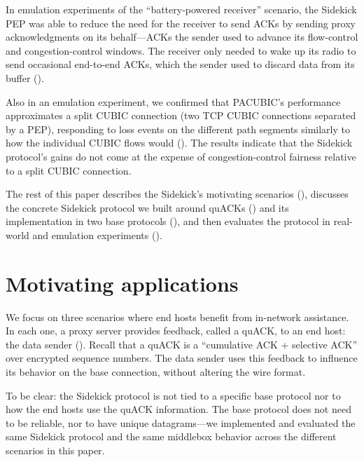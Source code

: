 In emulation experiments of the ``battery-powered receiver'' scenario,
the Sidekick PEP was able to reduce the need for the receiver to send ACKs
by sending proxy acknowledgments on its behalf---ACKs the sender used
to advance its flow-control and congestion-control windows. The
receiver only needed to wake up its radio to send occasional
end-to-end ACKs, which the sender used to discard data from its
buffer ().

Also in an emulation experiment, we confirmed that PACUBIC's
performance approximates a split CUBIC connection (two TCP CUBIC
connections separated by a PEP), responding to loss events on the
different path segments similarly to how the individual CUBIC flows would
(). The results indicate that the Sidekick protocol's gains
do not come at the
expense of congestion-control fairness relative to a split CUBIC connection.

\smallskip

The rest of this paper describes the Sidekick's motivating scenarios
(), discusses the concrete Sidekick protocol we
built around quACKs () and its implementation in two
base protocols (), and then evaluates the
protocol in real-world and emulation experiments
().

\section{Motivating applications}
\label{sec:sidekick:motivating}



We focus on three scenarios where end hosts benefit from in-network assistance.
In each one, a proxy server provides feedback, called a quACK, to an end host:
the data sender (). Recall that a quACK is a
``cumulative ACK + selective ACK'' over encrypted sequence numbers. The data
sender uses this feedback to influence its behavior on the base connection,
without altering the wire format.

To be clear: the Sidekick protocol is not tied to a specific base protocol
nor to how the end hosts use the quACK information. The base protocol does not
need to be reliable, nor to have unique datagrams---we implemented and evaluated
the same Sidekick protocol and the same middlebox behavior across the different
scenarios in this paper.

